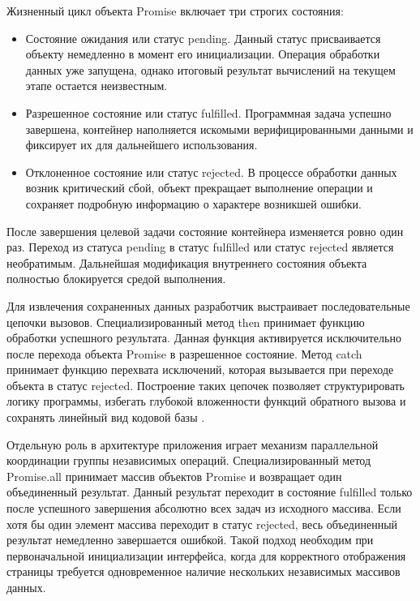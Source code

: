 \documentclass[bachelor, och, pract, times]{SCWorks}
\begin{document}
Жизненный цикл объекта Promise включает три строгих состояния:
\begin{itemize}
    \item Состояние ожидания или статус pending. Данный статус присваивается
      объекту немедленно в момент его инициализации. Операция обработки данных
      уже запущена, однако итоговый результат вычислений на текущем этапе
      остается неизвестным.
    \item Разрешенное состояние или статус fulfilled. Программная задача
      успешно завершена, контейнер наполняется искомыми верифицированными
      данными и фиксирует их для дальнейшего использования.
    \item Отклоненное состояние или статус rejected. В процессе обработки
      данных возник критический сбой, объект прекращает выполнение операции и
      сохраняет подробную информацию о характере возникшей ошибки.
\end{itemize}

После завершения целевой задачи состояние контейнера изменяется ровно один раз.
Переход из статуса pending в статус fulfilled или статус rejected является
необратимым. Дальнейшая модификация внутреннего состояния объекта полностью
блокируется средой выполнения.

Для извлечения сохраненных данных разработчик выстраивает последовательные
цепочки вызовов. Специализированный метод then принимает функцию обработки
успешного результата. Данная функция активируется исключительно после перехода
объекта Promise в разрешенное состояние. Метод catch принимает функцию
перехвата исключений, которая вызывается при переходе объекта в статус
rejected. Построение таких цепочек позволяет структурировать логику программы,
избегать глубокой вложенности функций обратного вызова и сохранять линейный вид
кодовой базы \cite{learn_js_promise, mdn_promise}.

Отдельную роль в архитектуре приложения играет механизм параллельной
координации группы независимых операций. Специализированный метод Promise.all
принимает массив объектов Promise и возвращает один объединенный результат.
Данный результат переходит в состояние fulfilled только после успешного
завершения абсолютно всех задач из исходного массива. Если хотя бы один элемент
массива переходит в статус rejected, весь объединенный результат немедленно
завершается ошибкой. Такой подход необходим при первоначальной инициализации
интерфейса, когда для корректного отображения страницы требуется одновременное
наличие нескольких независимых массивов данных.
\end{document}
